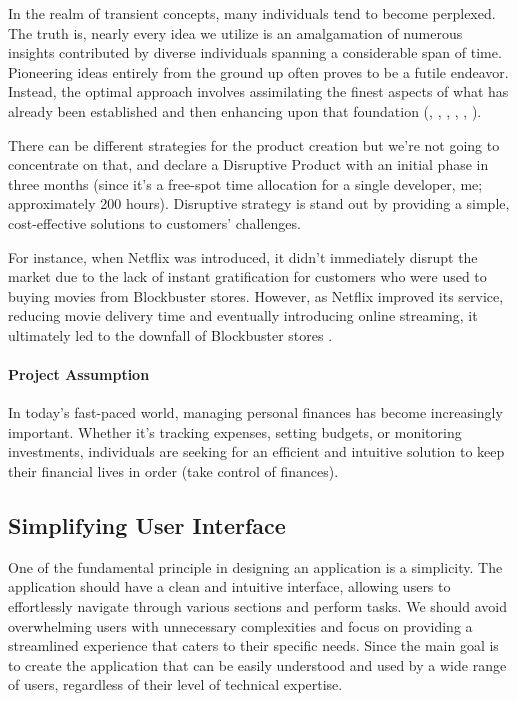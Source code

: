 
In the realm of transient concepts, many individuals tend to become perplexed. The truth is, nearly every idea we 
utilize is an amalgamation of numerous insights contributed by diverse individuals spanning a considerable span of 
time. Pioneering ideas entirely from the ground up often proves to be a futile endeavor. Instead, the optimal approach 
involves assimilating the finest aspects of what has already been established and then enhancing upon that foundation
(\cite{Azar22}, \cite{Page19}, \cite{Bara18}, \cite{Kleo12}, \cite{Thag12}, \cite{John11}).

There can be different strategies for the product creation \cite{Lomb17} but we're not going to concentrate on that,
and declare a Disruptive Product with an initial phase in three months (since it's a free-spot time allocation
for a single developer, me; approximately 200 hours). Disruptive strategy is stand out by providing a simple, 
cost-effective solutions to customers' challenges. 

For instance, when Netflix was introduced, it didn't immediately disrupt the market due to the lack of instant 
gratification for customers who were used to buying movies from Blockbuster stores. However, as Netflix 
improved its service, reducing movie delivery time and eventually introducing online streaming, it ultimately led 
to the downfall of Blockbuster stores \cite{Eby17}.

\paragraph{Project Assumption} In today's fast-paced world, managing personal finances has become increasingly 
important. Whether it's tracking expenses, setting budgets, or monitoring investments, individuals are seeking for an 
efficient and intuitive solution to keep their financial lives in order (take control of finances).


\subsection{Simplifying User Interface}

One of the fundamental principle in designing an application is a simplicity. The application should have a clean and 
intuitive interface, allowing users to effortlessly navigate through various sections and perform tasks. We should avoid 
overwhelming users with unnecessary complexities and focus on providing a streamlined experience that caters to 
their specific needs. Since the main goal is to create the application that can be easily understood and used by a wide 
range of users, regardless of their level of technical expertise.

